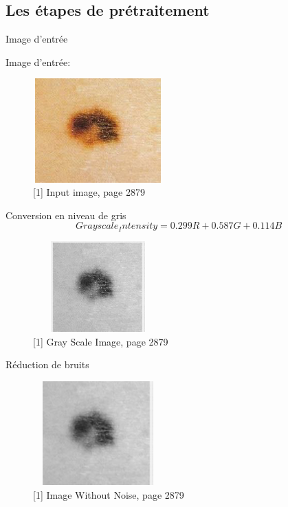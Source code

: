 \documentclass{beamer}
\begin{document}
\subsection{Les étapes de prétraitement}
\begin{frame}{Image d'entrée}
\par Image d'entrée:
		\begin{figure}[H]
    \includegraphics[width=5cm,height=4cm]{images/input_1.png}
    \caption{[1] Input image, page 2879}
    \label{fig:L1}
\end{figure}
\end{frame}
\begin{frame}{Conversion en niveau de gris}
$$Grayscale_Intensity = 0.299 R + 0.587 G + 0.114 B$$
		\begin{figure}[H]
    \includegraphics[width=5cm,height=3.5cm]{images/input_2.png}
    \caption{[1] Gray Scale Image, page 2879}
    \label{fig:L1}
\end{figure}
\end{frame}
\begin{frame}{Réduction de bruits}
		\begin{figure}[H]
    \includegraphics[width=5cm,height=4cm]{images/input_3.png}
    \caption{[1] Image Without Noise, page 2879}
    \label{fig:L1}
\end{figure}
\end{frame}
\end{document}

